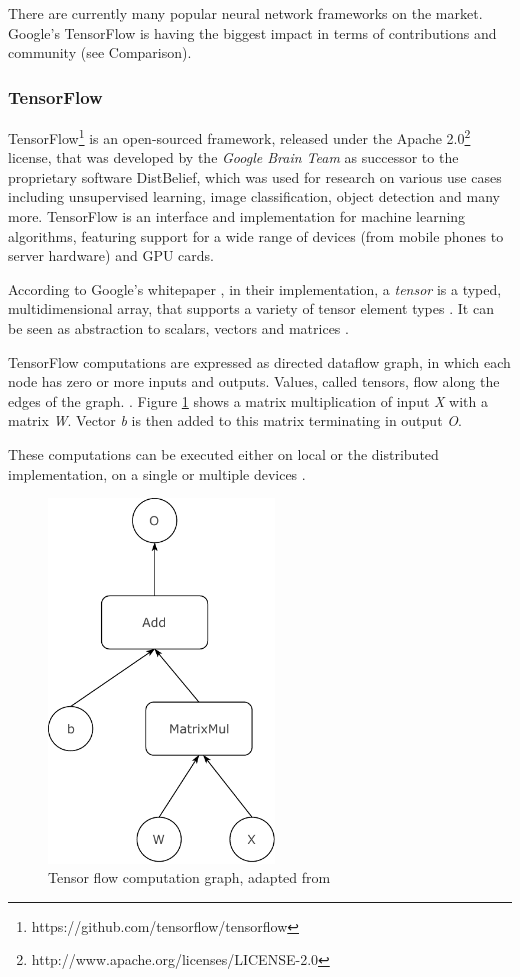 There are currently many popular neural network frameworks on the
market. Google's TensorFlow is having the biggest impact in terms of
contributions and community (see Comparison).

\subsubsection{TensorFlow}\label{tensorflow}

TensorFlow\footnote{https://github.com/tensorflow/tensorflow} is an
open-sourced framework, released under the Apache 2.0\footnote{http://www.apache.org/licenses/LICENSE-2.0}
license, that was developed by the \emph{Google Brain Team} as successor
to the proprietary software DistBelief, which was used for research on
various use cases including unsupervised learning, image classification,
object detection and many more. TensorFlow is an interface and
implementation for machine learning algorithms, featuring support for a
wide range of devices (from mobile phones to server hardware) and GPU
cards. \cite{dean-tensor}

According to Google's whitepaper \cite{dean-tensor}, in their
implementation, a \emph{tensor} is a typed, multidimensional array, that
supports a variety of tensor element types . It can be seen as
abstraction to scalars, vectors and matrices \cite{raschka2017machine}.

TensorFlow computations are expressed as directed dataflow graph, in
which each node has zero or more inputs and outputs. Values, called
tensors, flow along the edges of the graph. \cite{dean-tensor}. Figure
\ref{tensor-flow-graph} shows a matrix multiplication of input \emph{X}
with a matrix \emph{W}. Vector \emph{b} is then added to this matrix
terminating in output \emph{O}.

These computations can be executed either on local or the distributed
implementation, on a single or multiple devices \cite{dean-tensor}.

\begin{figure}
\centering
\includegraphics[width=6.00000cm]{images/tensorflow_comp_graph}
\caption{Tensor flow computation graph, adapted from \cite{dean-tensor}
\label{tensor-flow-graph}}
\end{figure}

